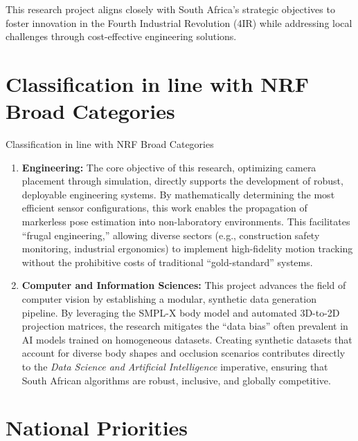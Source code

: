 \renewcommand{\labelenumii}{\arabic{enumi}.\arabic{enumii}}
\renewcommand{\labelenumiii}{\arabic{enumi}.\arabic{enumii}.\arabic{enumiii}}
\renewcommand{\labelenumiv}{\arabic{enumi}.\arabic{enumii}.\arabic{enumiii}.\arabic{enumiv}}

\label{chap:alignmenttonationalimperatives}

This research project aligns closely with South Africa’s strategic objectives to foster innovation in the Fourth Industrial Revolution (4IR) while addressing local challenges through cost-effective engineering solutions.

\section{Classification in line with NRF Broad Categories}{Classification in line with NRF Broad Categories}
\label{sec:nrf_classification}

\begin{enumerate}
    \item \textbf{Engineering:}
    The core objective of this research, optimizing camera placement through simulation, directly supports the development of robust, deployable engineering systems. By mathematically determining the most efficient sensor configurations, this work enables the propagation of markerless pose estimation into non-laboratory environments. This facilitates ``frugal engineering,'' allowing diverse sectors (e.g., construction safety monitoring, industrial ergonomics) to implement high-fidelity motion tracking without the prohibitive costs of traditional ``gold-standard'' systems.

    \item \textbf{Computer and Information Sciences:}
    This project advances the field of computer vision by establishing a modular, synthetic data generation pipeline. By leveraging the SMPL-X body model and automated 3D-to-2D projection matrices, the research mitigates the ``data bias'' often prevalent in AI models trained on homogeneous datasets. Creating synthetic datasets that account for diverse body shapes and occlusion scenarios contributes directly to the \textit{Data Science and Artificial Intelligence} imperative, ensuring that South African algorithms are robust, inclusive, and globally competitive.
\end{enumerate}

\section{National Priorities}
\label{sec:national_priorities}

